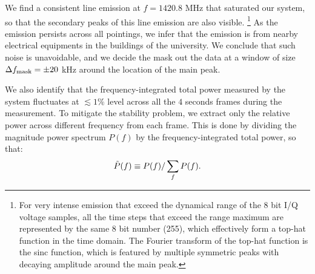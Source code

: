 \documentclass[12pt]{article}
\begin{document}
    We find a consistent line emission at $f=1420.8$ MHz that saturated our system, so that the secondary peaks of this line emission are also visible. 
    \footnote{For very intense emission that exceed the dynamical range of the $8$ bit I/Q voltage samples, all the time steps that exceed the range maximum are represented by the same $8$ bit number (255), which effectively form a top-hat function in the time domain. The Fourier transform of the top-hat function is the sinc function, which is featured by multiple symmetric peaks with decaying amplitude around the main peak. }
    As the emission persists across all pointings, we infer that the emission is from nearby electrical equipments in the buildings of the university.
    We conclude that such noise is unavoidable, and we decide the mask out the data at a window of size $\Delta f_{\rm mask} = \pm 20$ kHz around the location of the main peak.

    We also identify that the frequency-integrated total power measured by the system fluctuates at $\lesssim 1\%$ level across all the $4$ seconds frames during the measurement. 
    To mitigate the stability problem, we extract only the relative power across different frequency from each frame. 
    This is done by dividing the magnitude power spectrum $P(f)$ by the frequency-integrated total power, so that:
    \begin{equation}
        \Tilde{P}(f) \equiv P(f) / \sum_f P(f).
    \end{equation}
    
\end{document}

